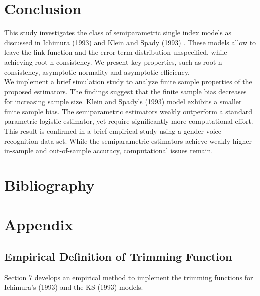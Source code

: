 \section{Conclusion} %
\label{sec:Conclusion}

This study investigates the class of semiparametric single index models as discussed in Ichimura (1993) \cite{[6]} and Klein and Spady (1993) \cite{[12]}. These models allow to leave the link function and the error term distribution unspecified, while achieving root-n consistency. We present key properties, such as root-n consistency, asymptotic normality and asymptotic efficiency.\\
We implement a brief simulation study to analyze finite sample properties of the proposed estimators. The findings suggest that the finite sample bias decreases for increasing sample size. Klein and Spady's (1993) \cite{[12]} model exhibits a smaller finite sample bias. The semiparametric estimators weakly outperform a standard parametric logistic estimator, yet require significantly more computational effort.\\
This result is confirmed in a brief empirical study using a gender voice recognition data set. While the semiparametric estimators achieve weakly higher in-sample and out-of-sample accuracy, computational issues remain.\\



\newpage 



\section{Bibliography} %
\printbibliography


\newpage 

\section{Appendix}
\label{sec:appendix}


\subsection{Empirical Definition of Trimming Function}
Section 7 develops an empirical method to implement the trimming functions for Ichimura's (1993) \cite{[6]} and the KS (1993) \cite{[12]} models.

